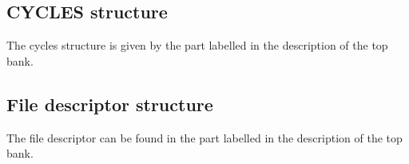 \subsection*{CYCLES structure}

The cycles structure is given by the part 
labelled  in the description of the top bank.
%
%
%
%
%
%
%

\subsection*{File descriptor structure}

The file descriptor can be found in the
part labelled  in the description of the top bank.

